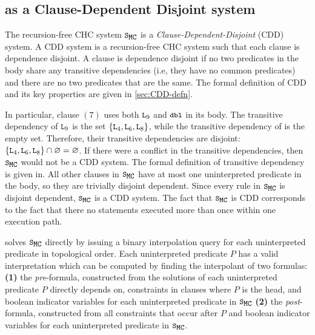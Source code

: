 \subsection{ as a Clause-Dependent Disjoint system}
\label{sec:solve-ex}
The recursion-free CHC system $\mcchc$ is a
\emph{Clause-Dependent-Disjoint} (CDD) system.
A CDD system is a recursion-free CHC system such that
each clause is dependence disjoint.
A clause is dependence disjoint if no two predicates in the body share
any transitive dependencies (i.e, they have no common predicates) and
there are no two predicates that are the same.
%
The formal definition of CDD and its key properties are given in
\autoref{sec:CDD-defn}.

In particular, clause $(7)$ uses both $\cc{L}_9$ and $\cc{dbl}$ in its
body.
%
The transitive dependency of $\cc{L}_9$ is the set
$\{\cc{L}_4,\cc{L}_6,\cc{L}_8\}$, while the transitive dependency of
 is the empty set.
%
Therefore, their transitive dependencies are disjoint:
$\{\cc{L}_4,\cc{L}_6,\cc{L}_8\} \cap \varnothing = \varnothing$.
If there were a conflict in the transitive dependencies, then $\mcchc$
would not be a CDD system.
%
The formal definition of transitive dependency is given in.
%
All other clauses in $\mcchc$ have at most one uninterpreted predicate
in the body, so they are trivially disjoint dependent.
%
Since every rule in $\mcchc$ is disjoint dependent, $\mcchc$ is a CDD
system.
%
The fact that $\mcchc$ is CDD corresponds to the fact that there no
statements executed more than once within one execution path.
%

\sys solves $\mcchc$ directly by issuing a binary interpolation query
for each uninterpreted predicate in topological order.
%
Each uninterpreted predicate $P$ has a valid interpretation which can
be computed by finding the interpolant of two formulas:
\textbf{(1)} the \emph{pre}-formula, constructed from the solutions of
each uninterpreted predicate $P$ directly depends on, constraints in
clauses where $P$ is the head, and boolean indicator variables for
each uninterpreted predicate in $\mcchc$%
\textbf{(2)} the \emph{post}-formula, constructed from
all constraints that occur after $P$ and boolean indicator
variables for each uninterpreted predicate in $\mcchc$.
%

